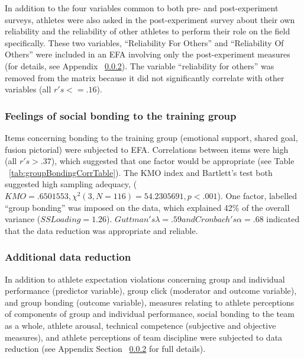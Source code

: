 \begin{landscape}
\centering

 \end{landscape}
\restoregeometry


In addition to the four variables common to both pre- and post-experiment surveys, athletes were also asked in the post-experiment survey about their own reliability and the reliability of other athletes to perform their role on the field specifically. These two variables, ``Reliability For Others'' and ``Reliability Of Others'' were included in an EFA involving only the post-experiment measures (for details, see Appendix ~\ref{}).  The variable ``reliability for others'' was removed from the matrix because it did not significantly correlate with other variables (all $r's <= .16$).

\subsubsection{Feelings of social bonding to the training group}
Items concerning bonding to the training group (emotional support, shared goal, fusion pictorial) were subjected to EFA.  Correlations between items were high (all $r's > .37$), which suggested that one factor would be appropriate (see Table ~\ref{tab:groupBondingCorrTable}). The KMO index and Bartlett's test both suggested high sampling adequacy, ($KMO =  .6501553, \chi^2(3, N = 116) = 54.2305691, p < .001$).
One factor, labelled ``group bonding'' was imposed on the data, which explained 42\% of the overall variance ($SS Loading = 1.26$). $Guttman's \lambda = .59 and Cronbach's \alpha = .68$ indicated that the data reduction was appropriate and reliable.

\subsubsection{Additional data reduction}
In addition to athlete expectation violations concerning group and individual performance (predictor variable), group click (moderator and outcome variable), and group bonding (outcome variable), measures relating to athlete perceptions of components of group and individual performance, social bonding to the team as a whole, athlete arousal, technical competence (subjective and objective measures), and athlete perceptions of team discipline were subjected to data reduction (see Appendix Section ~\ref{} for full details).


